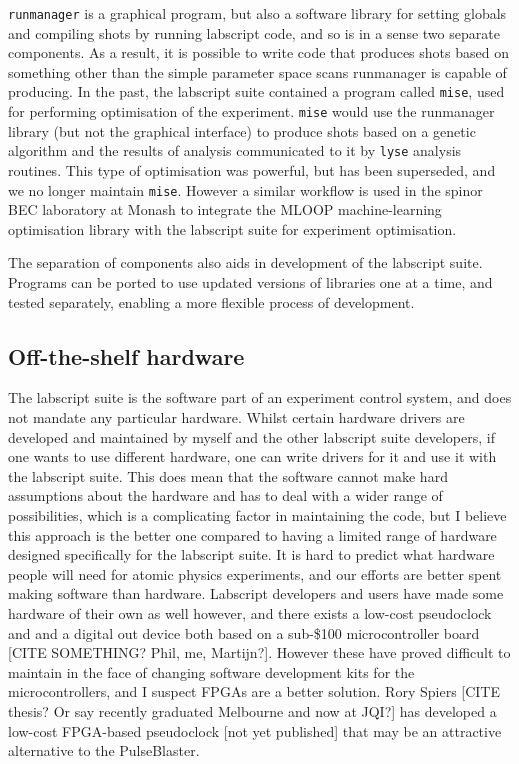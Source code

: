 \texttt{runmanager} is a graphical program, but also a software library for setting globals and compiling shots by running labscript code, and so is in a sense two separate components. As a result, it is possible to write code that produces shots based on something other than the simple parameter space scans runmanager is capable of producing. In the past, the labscript suite contained a program called \texttt{mise}, used for performing optimisation of the experiment. \texttt{mise} would use the runmanager library (but not the graphical interface) to produce shots based on a genetic algorithm and the results of analysis communicated to it by \texttt{lyse} analysis routines. This type of optimisation was powerful, but has been superseded, and we no longer maintain \texttt{mise}. However a similar workflow is used in the spinor BEC laboratory at Monash to integrate the MLOOP machine-learning optimisation library with the labscript suite for experiment optimisation.

The separation of components also aids in development of the labscript suite. Programs can be ported to use updated versions of libraries one at a time, and tested separately, enabling a more flexible process of development.


\subsection{Off-the-shelf hardware}

The labscript suite is the software part of an experiment control system, and does not mandate any particular hardware. Whilst certain hardware drivers are developed and maintained by myself and the other labscript suite developers, if one wants to use different hardware, one can write drivers for it and use it with the labscript suite. This does mean that the software cannot make hard assumptions about the hardware and has to deal with a wider range of possibilities, which is a complicating factor in maintaining the code, but I believe this approach is the better one compared to having a limited range of hardware designed specifically for the labscript suite. It is hard to predict what hardware people will need for atomic physics experiments, and our efforts are better spent making software than hardware. Labscript developers and users have made some hardware of their own as well however, and there exists a low-cost pseudoclock and and a digital out device both based on a sub-\$100 microcontroller board [CITE SOMETHING? Phil, me, Martijn?]. However these have proved difficult to maintain in the face of changing software development kits for the microcontrollers, and I suspect FPGAs are a better solution. Rory Spiers [CITE thesis? Or say recently graduated Melbourne and now at JQI?] has developed a low-cost FPGA-based pseudoclock [not yet published] that may be an attractive alternative to the PulseBlaster.

